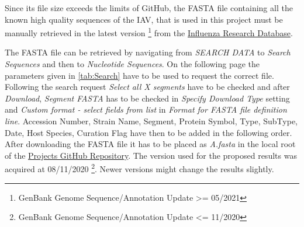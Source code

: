Since its file size exceeds the limits of GitHub, the FASTA file containing all the known high quality sequences of the \gls{IAV}, that is used in this project must be manually retrieved in the latest version \footnote{GenBank Genome Sequence/Annotation Update >= 05/2021} from the \href{https://www.fludb.org/brc/home.spg?decorator=influenza}{Influenza Research Database}.

\begin{table}[!hbt]
    \centering
    \caption[Search Parameter for FASTA file]{\textbf{Search Parameter for FASTA file.} The parameters to use on the nucleotide sequence search interface of the \href{https://www.fludb.org/brc/home.spg?decorator=influenza}{Influenza Research Database}. All paremeters have to be precisely as listed for a exact replication of the FASTA file used in this project.}
    \label{tab:Search}
\end{table}

The FASTA file can be retrieved by navigating from \textit{SEARCH DATA} to \textit{Search Sequences} and then to \textit{Nucleotide Sequences}. On the following page the parameters given in \autoref{tab:Search} have to be used to request the correct file. Following the search request \textit{Select all X segments} have to be checked and after \textit{Download}, \textit{Segment FASTA} has to be checked in \textit{Specify Download Type} setting and \textit{Custom format - select fields from list} in \textit{Format for FASTA file definition line}. Accession Number, Strain Name, Segment, Protein Symbol, Type, SubType, Date, Host Species, Curation Flag have then to be added in the following order. After downloading the FASTA file it has to be placed as \textit{A.fasta} in the local root of the \href{https://github.com/ahenoch/Masterthesis.git}{Projects GitHub Repository}. The version used for the proposed results was acquired at 08/11/2020 \footnote{GenBank Genome Sequence/Annotation Update <= 11/2020 }. Newer versions might change the results slightly.

